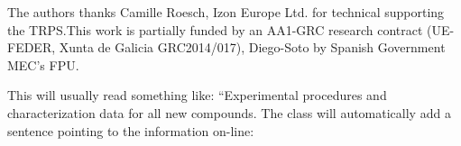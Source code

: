 \documentclass[journal=langd5,manuscript=article]{achemso}
\begin{document}
\begin{acknowledgement}

The authors thanks 
Camille Roesch, Izon Europe Ltd. for technical supporting the TRPS.This
work is partially funded by an AA1-GRC research contract (UE-FEDER,
Xunta de Galicia GRC2014/017), Diego-Soto by Spanish Government MEC’s FPU.

\end{acknowledgement}

\begin{suppinfo}

This will usually read something like: ``Experimental procedures and
characterization data for all new compounds. The class will
automatically add a sentence pointing to the information on-line:

\end{suppinfo}


\end{document}

